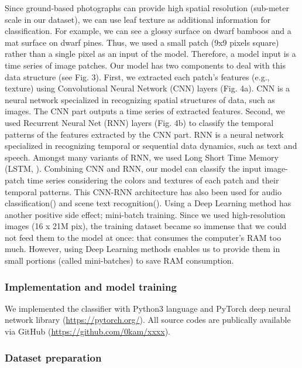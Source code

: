 \documentclass{article}
\begin{document}
Since ground-based photographs can provide high spatial resolution
(sub-meter scale in our dataset), we can use leaf texture as additional
information for classification. For example, we can see a glossy surface
on dwarf bamboos and a mat surface on dwarf pines. Thus, we used a small
patch (9x9 pixels square) rather than a single pixel as an input of the
model. Therefore, a model input is a time series of image patches. Our
model has two components to deal with this data structure (see Fig. 3).
First, we extracted each patch's features (e.g., texture) using
Convolutional Neural Network (CNN) layers (Fig. 4a). CNN is a neural
network specialized in recognizing spatial structures of data, such as
images. The CNN part outputs a time series of extracted features.
Second, we used Recurrent Neural Net (RNN) layers (Fig. 4b) to classify
the temporal patterns of the features extracted by the CNN part. RNN is
a neural network specialized in recognizing temporal or sequential data
dynamics, such as text and speech. Amongst many variants of RNN, we used
Long Short Time Memory (LSTM, \cite{Hochreiter1997LSTM}). Combining CNN
and RNN, our model can classify the input image-patch time series
considering the colors and textures of each patch and their temporal
patterns. This CNN-RNN architecture has also been used for audio
classification(\cite{Shi2015CRNNtext}) and scene text
recognition(\cite{Shi2015CRNNtext}). Using a Deep Learning method has
another positive side effect; mini-batch training. Since we used
high-resolution images (16 x 21M pix), the training dataset became so
immense that we could not feed them to the model at once: that consumes
the computer's RAM too much. However, using Deep Learning methods
enables us to provide them in small portions (called mini-batches) to
save RAM consumption.

\hypertarget{implementation-and-model-training}{%
\subsubsection{Implementation and model
training}\label{implementation-and-model-training}}

We implemented the classifier with Python3 language and PyTorch deep
neural network library (\url{https://pytorch.org/}). All source codes
are publically available via GitHub
(\url{https://github.com/0kam/xxxx}).

\hypertarget{dataset-preparation}{%
\subsubsection{Dataset preparation}\label{dataset-preparation}}
\end{document}

